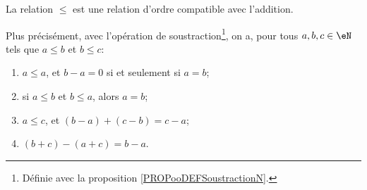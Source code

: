 \begin{proposition}     \label{PROPooVXBBooZcghrA}
	La relation \( \leq\) est une relation d'ordre compatible avec l'addition.

 	Plus précisément, avec l'opération de soustraction\footnote{Définie avec la proposition \ref{PROPooDEFSoustractionN}.}, on a, pour tous \( a, b, c \in \eN \) tels que \( a \leq b \) et \( b \leq c \):
  	\begin{enumerate}
		\item	\label{ITEMooSoustractionNi}
  			  	\( a \leq a \), et \( b - a = 0 \) si et seulement si \( a = b \);
		\item	\label{ITEMooSoustractionAntisym}
  				si  \( a \leq b \) et \( b \leq a \), alors \( a = b \);
		\item	\label{ITEMooSoustractionNii}
  				\( a \leq c \), et \( (b - a) + (c - b) = c - a \);
	  	\item	\label{ITEMooSoustractionNiii}
				\( (b + c) - (a + c) = b - a \).
    \end{enumerate}
\end{proposition}

